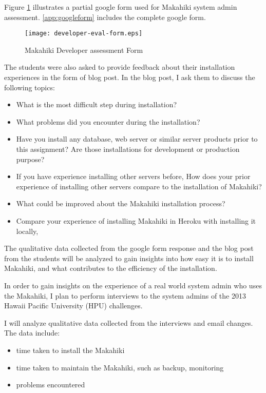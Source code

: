 Figure \ref{fig:developer-eval-form} illustrates a partial google form used for Makahiki system admin assessment. \autoref{app:googleform} includes the complete google form.
\begin{figure}[ht!]
   \centering
   \texttt{[image: developer-eval-form.eps]}
   \caption{Makahiki Developer assessment Form}
   \label{fig:developer-eval-form}
\end{figure}

The students were also asked to provide feedback about their installation experiences in the form of blog post. In the blog post, I ask them to discuss the following topics:
\begin{itemize}
\item What is the most difficult step during installation?
\item What problems did you encounter during the installation?
\item Have you install any database, web server or similar server products prior to this assignment? Are those installations for development or production purpose?
\item If you have experience installing other servers before, How does your prior experience of installing other servers compare to the installation of Makahiki?
\item What could be improved about the Makahiki installation process?
\item Compare your experience of installing Makahiki in Heroku with installing it locally,
\end{itemize}

The qualitative data collected from the google form response and the blog post from the students will be analyzed to gain insights into how easy it is to install Makahiki, and what contributes to the efficiency of the installation.

In order to gain insights on the experience of a real world system admin who uses the Makahiki, I plan to perform interviews to the system admins of the 2013 Hawaii Pacific University (HPU) challenges.

I will analyze qualitative data collected from the interviews and email changes. The data include:
\begin{itemize}
 \item time taken to install the Makahiki
 \item time taken to maintain the Makahiki, such as backup, monitoring
 \item problems encountered
\end{itemize}

